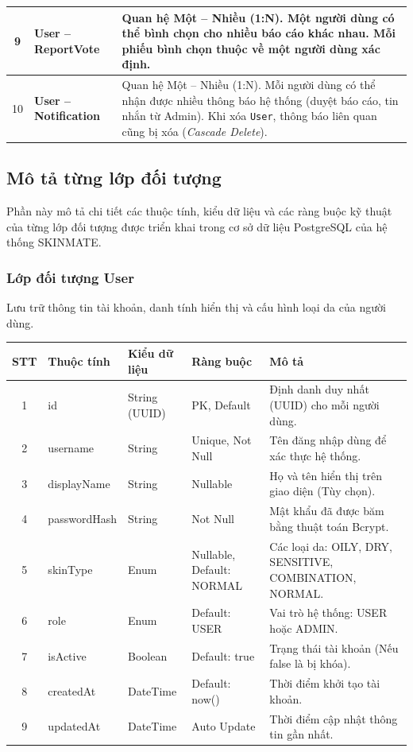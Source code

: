 \documentclass[12pt,a4paper]{article}
\begin{document}
\begin{center}
\begin{tabularx}{\textwidth}{|c|l|X|}
9 & \textbf{User -- ReportVote} & Quan hệ Một -- Nhiều (1:N). Một người dùng có thể bình chọn cho nhiều báo cáo khác nhau. Mỗi phiếu bình chọn thuộc về một người dùng xác định. \\ \hline

10 & \textbf{User -- Notification} & Quan hệ Một -- Nhiều (1:N). Mỗi người dùng có thể nhận được nhiều thông báo hệ thống (duyệt báo cáo, tin nhắn từ Admin). Khi xóa \texttt{User}, thông báo liên quan cũng bị xóa (\textit{Cascade Delete}). \\ \hline

\end{tabularx}
\end{center}



\subsection{Mô tả từng lớp đối tượng}

Phần này mô tả chi tiết các thuộc tính, kiểu dữ liệu và các ràng buộc kỹ thuật của từng lớp đối tượng được triển khai trong cơ sở dữ liệu PostgreSQL của hệ thống SKINMATE.

\subsubsection{Lớp đối tượng User}
Lưu trữ thông tin tài khoản, danh tính hiển thị và cấu hình loại da của người dùng.

\begin{center}
\renewcommand{\arraystretch}{1.4}
\begin{tabularx}{\textwidth}{|c|l|l|l|X|}
\hline
\rowcolor{blue!15}
\textbf{STT} & \textbf{Thuộc tính} & \textbf{Kiểu dữ liệu} & \textbf{Ràng buộc} & \textbf{Mô tả} \\ \hline
1 & id & String (UUID) & PK, Default & Định danh duy nhất (UUID) cho mỗi người dùng. \\ \hline
2 & username & String & Unique, Not Null & Tên đăng nhập dùng để xác thực hệ thống. \\ \hline
3 & displayName & String & Nullable & Họ và tên hiển thị trên giao diện (Tùy chọn). \\ \hline
4 & passwordHash & String & Not Null & Mật khẩu đã được băm bằng thuật toán Bcrypt. \\ \hline
5 & skinType & Enum & Nullable, Default: NORMAL & Các loại da: OILY, DRY, SENSITIVE, COMBINATION, NORMAL. \\ \hline
6 & role & Enum & Default: USER & Vai trò hệ thống: USER hoặc ADMIN. \\ \hline
7 & isActive & Boolean & Default: true & Trạng thái tài khoản (Nếu false là bị khóa). \\ \hline
8 & createdAt & DateTime & Default: now() & Thời điểm khởi tạo tài khoản. \\ \hline
9 & updatedAt & DateTime & Auto Update & Thời điểm cập nhật thông tin gần nhất. \\ \hline
\end{tabularx}
\end{center}
\end{document}
